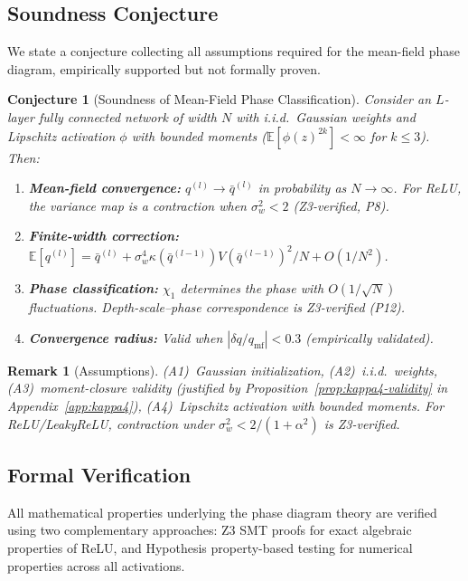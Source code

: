 \documentclass[10pt]{article}
\newcommand{\EE}{\mathbb{E}}
\newtheorem{conjecture}[theorem]{Conjecture}
\newtheorem{remark}[theorem]{Remark}
\begin{document}
\subsection{Soundness Conjecture}
\label{sec:soundness}

We state a conjecture collecting all assumptions required for the mean-field phase diagram, empirically supported but not formally proven.

\begin{conjecture}[Soundness of Mean-Field Phase Classification]
\label{conj:soundness}
Consider an $L$-layer fully connected network of width $N$ with i.i.d.\ Gaussian weights and Lipschitz activation $\phi$ with bounded moments ($\EE[\phi(z)^{2k}] < \infty$ for $k \leq 3$). Then:
\begin{enumerate}[nosep]
    \item \textbf{Mean-field convergence:} $q^{(l)} \to \bar{q}^{(l)}$ in probability as $N \to \infty$. For ReLU, the variance map is a contraction when $\sigma_w^2 < 2$ (Z3-verified, P8).
    \item \textbf{Finite-width correction:} $\EE[q^{(l)}] = \bar{q}^{(l)} + \sigma_w^4 \kappa(\bar{q}^{(l-1)}) V(\bar{q}^{(l-1)})^2 / N + O(1/N^2)$.
    \item \textbf{Phase classification:} $\chi_1$ determines the phase with $O(1/\sqrt{N})$ fluctuations. Depth-scale--phase correspondence is Z3-verified (P12).
    \item \textbf{Convergence radius:} Valid when $|\delta q / q_{\mathrm{mf}}| < 0.3$ (empirically validated).
\end{enumerate}
\end{conjecture}

\begin{remark}[Assumptions]
(A1)~Gaussian initialization, (A2)~i.i.d.\ weights, (A3)~moment-closure validity (justified by Proposition~\ref{prop:kappa4-validity} in Appendix~\ref{app:kappa4}), (A4)~Lipschitz activation with bounded moments.
For ReLU/LeakyReLU, contraction under $\sigma_w^2 < 2/(1+\alpha^2)$ is Z3-verified.
\end{remark}

\subsection{Formal Verification}
\label{sec:verification}

All mathematical properties underlying the phase diagram theory are verified using two complementary approaches: Z3 SMT proofs for exact algebraic properties of ReLU, and Hypothesis property-based testing for numerical properties across all activations.
\end{document}
